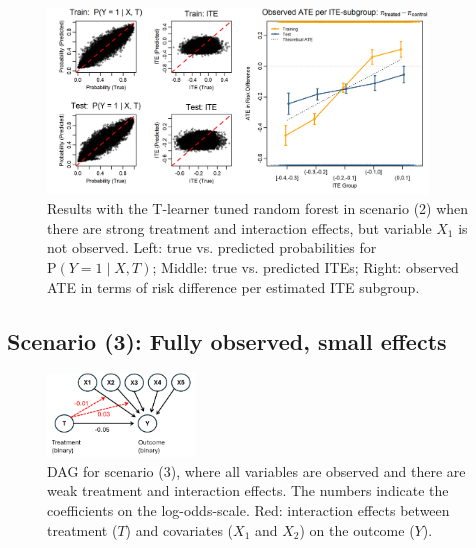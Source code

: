 \begin{figure}[htbp]
\centering
\includegraphics[width=0.9\textwidth]{img/results_ITE_simulation/unobserved_interaction_tuned_rf_tlearner.png}
\caption{Results with the T-learner tuned random forest in scenario (2) when there are strong treatment and interaction effects, but variable $X_1$ is not observed. Left: true vs. predicted probabilities for $\text{P}(Y=1 \mid X, T)$; Middle: true vs. predicted ITEs; Right: observed ATE in terms of risk difference per estimated ITE subgroup.}
\label{fig:unobserved_interaction_tuned_rf_tlearner}
\end{figure}


\clearpage

\subsection{Scenario (3): Fully observed, small effects}

\begin{figure}[htbp]
\centering
\includegraphics[width=0.35\textwidth]{img/results_ITE_simulation/simulation_small_effects.png}
\caption{DAG for scenario (3), where all variables are observed and there are weak treatment and interaction effects. The numbers indicate the coefficients on the log-odds-scale. Red: interaction effects between treatment ($T$) and covariates ($X_1$ and $X_2$) on the outcome ($Y$).}
\label{fig:small_interaction_dag}
\end{figure}




